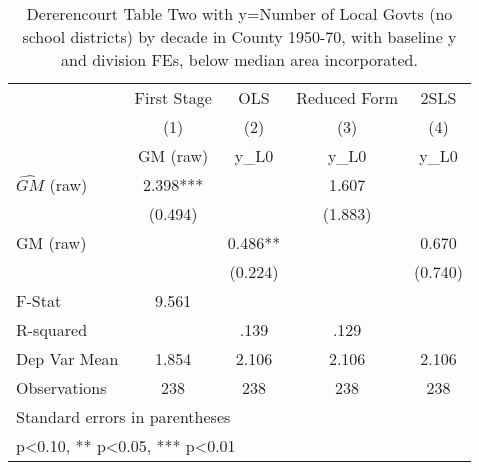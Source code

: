 \begin{table}[htbp]\centering
\def\sym#1{\ifmmode^{#1}\else\(^{#1}\)\fi}
\caption{Dererencourt Table Two with y=Number of Local Govts (no school districts) by decade in County 1950-70, with baseline y and division FEs, below median area incorporated.}
\begin{tabular}{l*{4}{c}}
\toprule
                    & First Stage   &         OLS   &Reduced Form   &        2SLS   \\
                    &\multicolumn{1}{c}{(1)}&\multicolumn{1}{c}{(2)}&\multicolumn{1}{c}{(3)}&\multicolumn{1}{c}{(4)}\\
                    &\multicolumn{1}{c}{GM  (raw)}&\multicolumn{1}{c}{y\_L0}&\multicolumn{1}{c}{y\_L0}&\multicolumn{1}{c}{y\_L0}\\
\midrule
$\hat{GM}$ (raw)    &       2.398***&               &       1.607   &               \\
                    &     (0.494)   &               &     (1.883)   &               \\
\addlinespace
GM  (raw)           &               &       0.486** &               &       0.670   \\
                    &               &     (0.224)   &               &     (0.740)   \\
\midrule
F-Stat              &       9.561   &               &               &               \\
R-squared           &               &        .139   &        .129   &               \\
Dep Var Mean        &       1.854   &       2.106   &       2.106   &       2.106   \\
Observations        &         238   &         238   &         238   &         238   \\
\bottomrule
\multicolumn{5}{l}{\footnotesize Standard errors in parentheses}\\
\multicolumn{5}{l}{\footnotesize * p<0.10, ** p<0.05, *** p<0.01}\\
\end{tabular}
\end{table}
